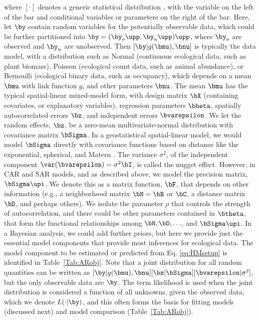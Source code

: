 where $[\cdot]$ denotes a generic statistical distribution \citep{Gelf:Smit:samp:1990}, with the variable on the left of the bar and conditional variables or parameters on the right of the bar.  Here, let $\by$ contain random variables for the potentially observable data, which could be further partitioned into $\by = (\by_o\upp, \by_u\upp)\upp$, where $\by_o$ are observed and $\by_u$ are unobserved.  Then $[\by|g(\bmu), \bnu]$ is typically the data model, with a distribution such as Normal (continuous ecological data, such as plant biomass), Poisson (ecological count data, such as animal abundance), or Bernoulli (ecological binary data, such as occupancy), which depends on a mean $\bmu$ with link function $g$, and other parameters $\bnu$.  The mean $\bmu$ has the typical spatial-linear mixed-model form, with design matrix $\bX$ (containing covariates, or explanatory variables), regression parameters $\bbeta$, spatially autocorrelated errors $\bz$, and independent errors $\bvarepsilon$.  We let the random effects, $\bz$, be a zero-mean multivariate-normal distribution with covariance matrix $\bSigma$.  In a geostatistical spatial-linear model, we would model $\bSigma$ directly with covariance functions based on distance like the exponential, spherical, and Matern \citep{Chil:Delf:geos:1999}. The variance $\sigma^2$, of the independent component $\var(\bvarepsilon) = \sigma^2\bI$, is called the nugget effect.  However, in CAR and SAR models, and as described above, we model the precision matrix, $\bSigma\upi$.  We denote this as a matrix function, $\bF$, that depends on other information (e.g., a neighborhood matrix $\bN = \bB$ or $\bC$, a distance matrix $\bD$, and perhaps others). We isolate the parameter $\rho$ that controls the strength of autocorrelation, and there could be other parameters contained in $\btheta$, that form the functional relationships among $\bN, \bD, \ldots$, and $\bSigma\upi$. In a Bayesian analysis, we could add further priors, but here we provide just the essential model components that provide most inferences for ecological data.  The model component to be estimated or predicted from Eq. \ref{eq:HMsetup} is identified in Table~\ref{Tab:ARobj}.  Note that a joint distribution for all random quantities can be written as $[\by|g(\bmu),\bnu][\bz|\bSigma][\bvarepsilon|\sigma^2]$, but the only observable data are $\by$. The term likelihood is used when the joint distribution is considered a function of all unknowns, given the observed data, which we denote $L(\cdot|\by)$, and this often forms the basis for fitting models (discussed next) and model comparison (Table~\ref{Tab:ARobj}).

